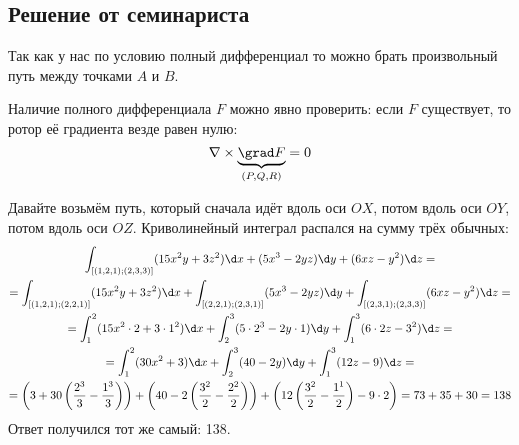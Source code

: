 	\subsection{Решение от семинариста}
		Так как у нас по условию полный дифференциал
		то можно брать произвольный путь между точками $A$ и $B$.
		\begin{Rem}
			Наличие полного дифференциала $F$ можно явно проверить: если $F$ существует, то
			ротор её градиента везде равен нулю:
			\[ \nabla \times \underbrace{\grad F}_{(P, Q, R)} = 0 \]
		\end{Rem}
		Давайте возьмём путь, который сначала идёт вдоль оси $OX$, потом вдоль оси $OY$,
		потом вдоль оси $OZ$.
		Криволинейный интеграл распался на сумму трёх обычных:
		\begin{gather*}
			\int_{[(1,2,1);(2,3,3)]} (15x^2y+3z^2)\d x + (5x^3-2yz)\d y + (6xz-y^2) \d z = \\
			= \int_{[(1,2,1);(2,2,1)]} (15x^2y+3z^2)\d x +
			\int_{[(2,2,1);(2,3,1)]} (5x^3-2yz)\d y  +
			\int_{[(2,3,1);(2,3,3)]} (6xz-y^2) \d z = \\
			= \int_1^2 (15x^2\cdot2+3\cdot1^2)\d x +
			\int_2^3 (5\cdot2^3-2y\cdot1)\d y  +
			\int_1^3 (6\cdot2z-3^2) \d z = \\
			= \int_1^2 (30x^2+3)\d x +
			\int_2^3 (40-2y)\d y  +
			\int_1^3 (12z-9) \d z = \\
			= \left(3 + 30\left(\frac{2^3}{3}-\frac{1^3}{3}\right)\right) +
			\left(40 - 2\left(\frac{3^2}{2}-\frac{2^2}{2}\right)\right) +
			\left(12\left(\frac{3^2}{2}-\frac{1^1}{2}\right)-9\cdot2\right) =
			73 + 35 + 30 = 138
		\end{gather*}
		Ответ получился тот же самый: 138.

